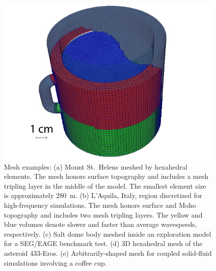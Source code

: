 \documentclass[referee,extra]{gji}
\begin{document}
\begin{figure}
\begin{center}
\begin{minipage}[t]{0.45\textwidth}
\begin{center}
\includegraphics[width=1.\textwidth]{./images/mesh_coffeecup.jpg}
\end{center}
\end{minipage}
\end{center}
\caption{Mesh examples: (a) Mount St.~Helens meshed by hexahedral elements.
The mesh honors surface topography and includes a mesh tripling layer in the middle of the model.
The smallest element size is approximately 280~m.
(b) L'Aquila, Italy, region discretized for high-frequency simulations.
The mesh honors surface and Moho topography and includes two mesh tripling layers.
The yellow and blue volumes denote slower and faster than average wavespeeds, respectively.
(c) Salt dome body meshed inside an exploration model for a SEG/EAGE benchmark test.
(d) 3D hexahedral mesh of the asteroid 433-Eros.
(e) Arbitrarily-shaped mesh for coupled solid-fluid simulations involving a coffee cup.
}
\label{figure:mountsthelens}
\end{figure}
\end{document}
